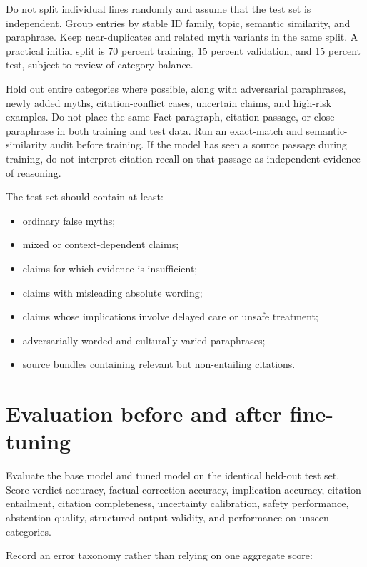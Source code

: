\documentclass[11pt,oneside]{book}
\begin{document}
Do not split individual lines randomly and assume that the test set is independent. Group entries by stable ID family, topic, semantic similarity, and paraphrase. Keep near-duplicates and related myth variants in the same split. A practical initial split is 70 percent training, 15 percent validation, and 15 percent test, subject to review of category balance.

Hold out entire categories where possible, along with adversarial paraphrases, newly added myths, citation-conflict cases, uncertain claims, and high-risk examples. Do not place the same Fact paragraph, citation passage, or close paraphrase in both training and test data. Run an exact-match and semantic-similarity audit before training. If the model has seen a source passage during training, do not interpret citation recall on that passage as independent evidence of reasoning.

The test set should contain at least:

\begin{itemize}
\item ordinary false myths;
\item mixed or context-dependent claims;
\item claims for which evidence is insufficient;
\item claims with misleading absolute wording;
\item claims whose implications involve delayed care or unsafe treatment;
\item adversarially worded and culturally varied paraphrases;
\item source bundles containing relevant but non-entailing citations.
\end{itemize}

\section{Evaluation before and after fine-tuning}

Evaluate the base model and tuned model on the identical held-out test set. Score verdict accuracy, factual correction accuracy, implication accuracy, citation entailment, citation completeness, uncertainty calibration, safety performance, abstention quality, structured-output validity, and performance on unseen categories.

Record an error taxonomy rather than relying on one aggregate score:
\end{document}
